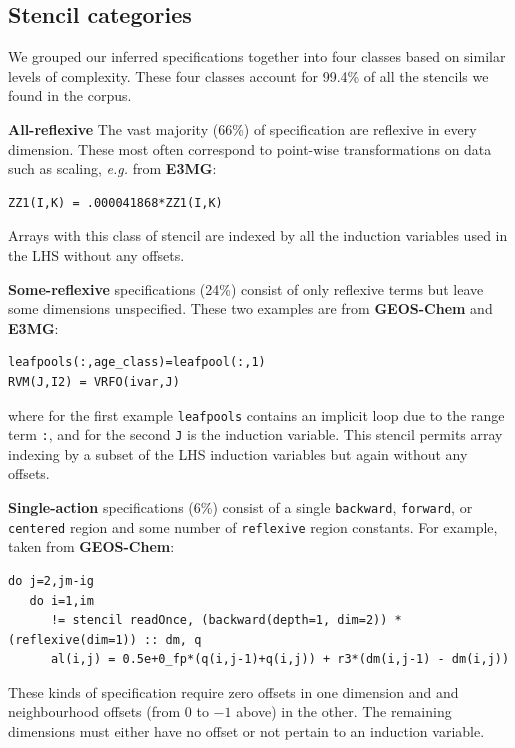 \documentclass[9pt,preprint]{sigplanconf}
\theoremstyle{definition}
\newcommand{\eg}{\emph{e.g.}}
\newcommand{\term}[1]{\texttt{#1}}
\begin{document}
\subsection{Stencil categories}

We grouped our inferred specifications together into four classes based on similar levels of complexity. These four classes account for 99.4\% of all the stencils we found in the corpus.

\textbf{All-reflexive} The vast majority (66\%) of specification are
reflexive in every dimension. These most often correspond
to point-wise transformations on data such as scaling, \eg{} from \textbf{E3MG}: \begin{verbatim}
ZZ1(I,K) = .000041868*ZZ1(I,K)
\end{verbatim}
Arrays with this class of stencil are indexed by all the induction
variables used in the LHS without any offsets.

\textbf{Some-reflexive} specifications (24\%) consist of only reflexive terms but
leave some dimensions unspecified. These two examples are from
\textbf{GEOS-Chem} and \textbf{E3MG}: 
\begin{verbatim}
leafpools(:,age_class)=leafpool(:,1)
RVM(J,I2) = VRFO(ivar,J)
\end{verbatim}
where for the first example \texttt{leafpools} contains an
implicit loop due to the range term \texttt{:}, and for the second \texttt{J} is
the induction variable. This stencil permits array indexing by a subset of the LHS induction variables but again without
any offsets.

\textbf{Single-action} specifications (6\%) consist of a single \term{backward},
\term{forward}, or \term{centered} region and some number of \term{reflexive}
region constants. For example, taken from \textbf{GEOS-Chem}: 
\begin{verbatim}
do j=2,jm-ig
   do i=1,im
      != stencil readOnce, (backward(depth=1, dim=2)) *(reflexive(dim=1)) :: dm, q
      al(i,j) = 0.5e+0_fp*(q(i,j-1)+q(i,j)) + r3*(dm(i,j-1) - dm(i,j))
\end{verbatim}
These kinds of specification require zero offsets in one dimension and 
and neighbourhood offsets (from 0 to $-1$ above) in the other.
The remaining dimensions must either have no offset or not pertain to
an induction variable.
\end{document}
